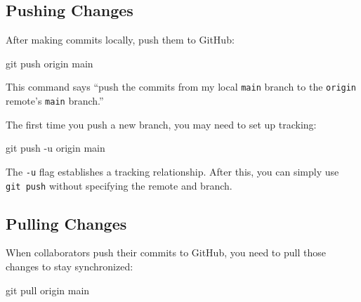 \documentclass[
  letterpaper,
  DIV=11,
  numbers=noendperiod]{scrreprt}
\newenvironment{Shaded}{\begin{snugshade}}{\end{snugshade}}
\newcommand{\AttributeTok}[1]{\textcolor[rgb]{0.40,0.45,0.13}{#1}}
\newcommand{\FunctionTok}[1]{\textcolor[rgb]{0.28,0.35,0.67}{#1}}
\newcommand{\NormalTok}[1]{\textcolor[rgb]{0.00,0.23,0.31}{#1}}
\begin{document}
\subsection{Pushing Changes}\label{pushing-changes}

After making commits locally, push them to GitHub:

\begin{codelisting}

\caption{\texttt{terminal}}

\begin{Shaded}
\begin{Highlighting}[]
\FunctionTok{git}\NormalTok{ push origin main}
\end{Highlighting}
\end{Shaded}

\end{codelisting}

This command says ``push the commits from my local \texttt{main} branch
to the \texttt{origin} remote's \texttt{main} branch.''

The first time you push a new branch, you may need to set up tracking:

\begin{codelisting}

\caption{\texttt{terminal}}

\begin{Shaded}
\begin{Highlighting}[]
\FunctionTok{git}\NormalTok{ push }\AttributeTok{{-}u}\NormalTok{ origin main}
\end{Highlighting}
\end{Shaded}

\end{codelisting}

The \texttt{-u} flag establishes a tracking relationship. After this,
you can simply use \texttt{git\ push} without specifying the remote and
branch.

\subsection{Pulling Changes}\label{pulling-changes}

When collaborators push their commits to GitHub, you need to pull those
changes to stay synchronized:

\begin{codelisting}

\caption{\texttt{terminal}}

\begin{Shaded}
\begin{Highlighting}[]
\FunctionTok{git}\NormalTok{ pull origin main}
\end{Highlighting}
\end{Shaded}

\end{codelisting}
\end{document}
